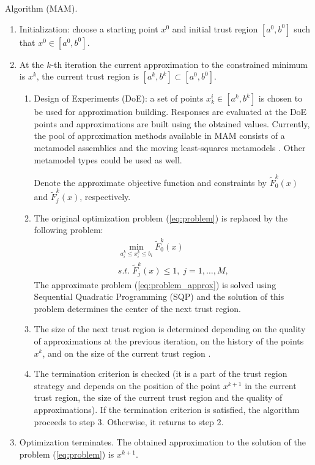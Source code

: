 \documentclass[runningheads,a4paper]{llncs}
\begin{document}
Algorithm (MAM).
\begin{enumerate}
\item Initialization: choose a starting point $ x^0$ and initial trust region $[ a^0,  b^0]$ such that $ x^0 \in [ a^0,  b^0]$.
\item At the $k$-th iteration the current approximation to the constrained minimum is $ x^k$, the current trust region is $[ a^k,  b^k] \subset [ a^0,  b^0]$.
  \begin{enumerate}[label=(\alph*)]
    \item Design of Experiments (DoE): a set of points $ x_k^i \in [ a^k,  b^k]$ is chosen to be used for approximation building. Responses are evaluated at the DoE points and approximations are built using the obtained values. Currently, the pool of approximation methods available in MAM consists of a metamodel assemblies \cite{PolynkinToropov2012} and the moving least-squares metamodels \cite{LancasterSalkauskas1981,Liszka1984,ChoiYounYang2001,ToropovSchrammSahaiJones2005}. Other metamodel types could be used as well.

    Denote the approximate objective function and constraints by $\widetilde{F}^k_0(x)$ and $\widetilde{F}^k_j(x)$, respectively.
    \item The original optimization problem (\ref{eq:problem}) is replaced by the following problem:
    \begin{equation}
      \label{eq:problem_approx}
      \begin{array}{c}
      \min\limits_{a_i^k \le x_i ^k\le b_i}\widetilde{F}^k_0(x) \\
      s.t.\; \widetilde{F}^k_j( x) \le 1,\; j=1,\dots ,M,
      \end{array}
    \end{equation}
    The approximate problem (\ref{eq:problem_approx}) is solved using Sequential Quadratic Programming (SQP) and the solution of this problem determines the center of the next trust region.
    \item The size of the next trust region is determined depending on the quality of approximations at the previous iteration, on the history of the points $ x^k$, and on the size of the current trust region \cite{KeulenToropovMarkine1996}.
    \item The termination criterion is checked (it is a part of the trust region strategy and depends on the position of the point $ x^{k+1}$ in the current trust region, the size of the current trust region and the quality of approximations). If the termination criterion is satisfied, the algorithm proceeds to step 3. Otherwise, it returns to step 2.
  \end{enumerate}
  \item Optimization terminates. The obtained approximation to the solution of the problem (\ref{eq:problem}) is $ x^{k+1}$.
\end{enumerate}
\end{document}
